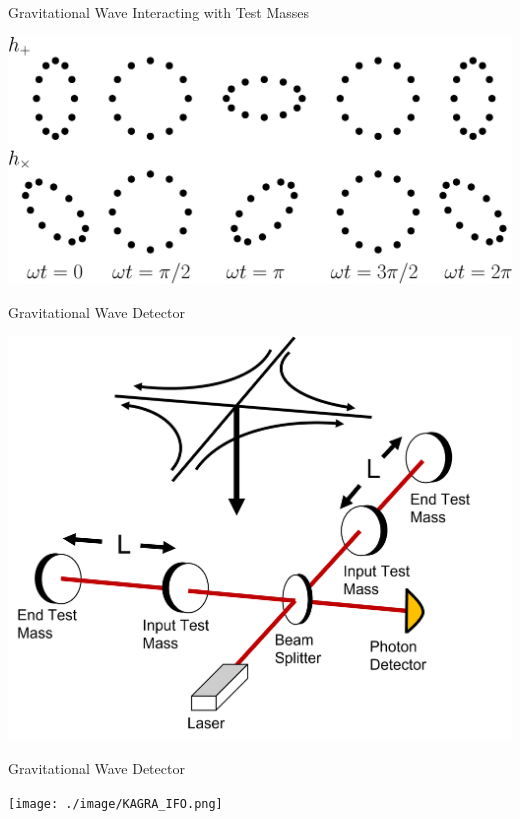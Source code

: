 \documentclass[xcolor=dvipsnames]{beamer}
\begin{document}
\begin{frame}[t]{Gravitational Wave Interacting with Test Masses}
  \begin{center}
    \includegraphics[width=\textwidth]{image/test-mass.png}
  \end{center}
\end{frame}

\begin{frame}[t]{Gravitational Wave Detector}
  \begin{center}
    \includegraphics[height=0.8\textheight]{./image/GW-detector.png}
  \end{center}
\end{frame}

\begin{frame}[t]{Gravitational Wave Detector}
  \begin{center}
    \texttt{[image: ./image/KAGRA\_IFO.png]}
  \end{center}
\end{frame}
\end{document}
